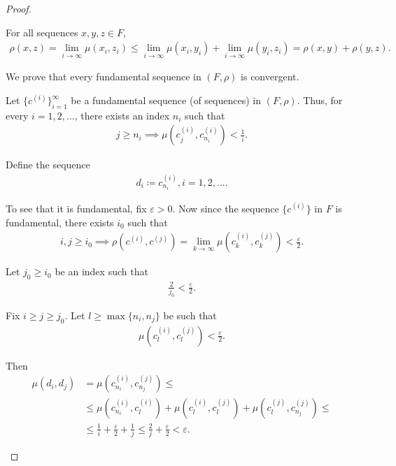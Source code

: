 \begin{proof}
\begin{defenum}
\begin{description}
       For all sequences $x, y, z \in F$,
      \begin{align*}
        \rho(x, z) = \lim_{i \to \infty} \mu(x_i, z_i) \leq \lim_{i \to \infty} \mu(x_i, y_i) + \lim_{i \to \infty} \mu(y_i, z_i) = \rho(x, y) + \rho(y, z).
      \end{align*}
    \end{description}

    \item\label{thm:metric_space_completion_existence/part_b} We prove that every fundamental sequence in $(F, \rho)$ is convergent.

    Let $\{ c^{(i)} \}_{i=1}^\infty$ be a fundamental sequence (of sequences) in $(F, \rho)$. Thus, for every $i = 1, 2, \ldots$, there exists an index $n_i$ such that
    \begin{align*}
      j \geq n_i \implies \mu(c_j^{(i)}, c_{n_i}^{(i)}) < \tfrac 1 i.
    \end{align*}

    Define the sequence
    \begin{align*}
      d_i \coloneqq c_{n_i}^{(i)}, i = 1, 2, \ldots.
    \end{align*}

    To see that it is fundamental, fix $\varepsilon > 0$. Now since the sequence $\{ c^{(i)} \}$ in $F$ is fundamental, there exists $i_0$ such that
    \begin{align*}
      i, j \geq i_0 \implies \rho(c^{(i)}, c^{(j)}) = \lim_{k \to \infty} \mu(c_k^{(i)}, c_k^{(j)}) < \frac \varepsilon 2.
    \end{align*}

    Let $j_0 \geq i_0$ be an index such that
    \begin{align*}
      \frac 2 {j_0} < \frac \varepsilon 2.
    \end{align*}

    Fix $i \geq j \geq j_0$. Let $l \geq \max \{ n_i, n_j \}$ be such that
    \begin{align*}
      \mu(c_l^{(i)}, c_l^{(j)}) < \frac \varepsilon 2.
    \end{align*}

    Then
    \begin{align*}
      \mu(d_i, d_j)
      &=
      \mu(c_{n_i}^{(i)}, c_{n_j}^{(j)})
      \leq \\ &\leq
      \mu(c_{n_i}^{(i)}, c_l^{(i)}) + \mu(c_l^{(i)}, c_l^{(j)}) + \mu(c_l^{(j)}, c_{n_j}^{(j)})
      \leq \\ &\leq
      \frac 1 i + \frac \varepsilon 2 + \frac 1 j
      \leq
      \frac 2 j + \frac \varepsilon 2
      <
      \varepsilon.
    \end{align*}


\end{defenum}
\end{proof}
